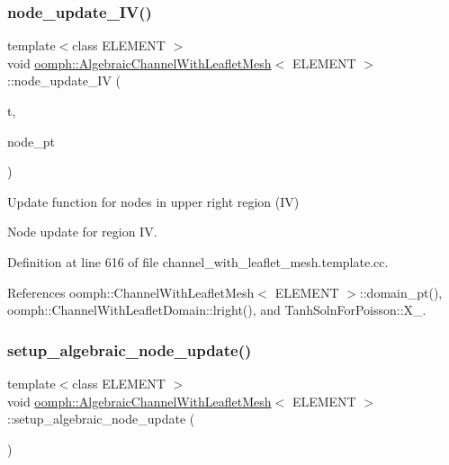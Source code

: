 \subsubsection{\texorpdfstring{node\+\_\+update\+\_\+\+I\+V()}{node\_update\_IV()}}
{\footnotesize\ttfamily template$<$class E\+L\+E\+M\+E\+NT $>$ \\
void \hyperlink{classoomph_1_1AlgebraicChannelWithLeafletMesh}{oomph\+::\+Algebraic\+Channel\+With\+Leaflet\+Mesh}$<$ E\+L\+E\+M\+E\+NT $>$\+::node\+\_\+update\+\_\+\+IV (\begin{DoxyParamCaption}\item[{const unsigned \&}]{t,  }\item[{Algebraic\+Node $\ast$\&}]{node\+\_\+pt }\end{DoxyParamCaption})\hspace{0.3cm}{\ttfamily [protected]}}



Update function for nodes in upper right region (IV) 

Node update for region IV. 

Definition at line 616 of file channel\+\_\+with\+\_\+leaflet\+\_\+mesh.\+template.\+cc.



References oomph\+::\+Channel\+With\+Leaflet\+Mesh$<$ E\+L\+E\+M\+E\+N\+T $>$\+::domain\+\_\+pt(), oomph\+::\+Channel\+With\+Leaflet\+Domain\+::lright(), and Tanh\+Soln\+For\+Poisson\+::\+X\+\_.

\mbox{\label{classoomph_1_1AlgebraicChannelWithLeafletMesh_a0d6cb8a8ffa830cdd73aa0f6686f150f}} 
\subsubsection{\texorpdfstring{setup\+\_\+algebraic\+\_\+node\+\_\+update()}{setup\_algebraic\_node\_update()}}
{\footnotesize\ttfamily template$<$class E\+L\+E\+M\+E\+NT $>$ \\
void \hyperlink{classoomph_1_1AlgebraicChannelWithLeafletMesh}{oomph\+::\+Algebraic\+Channel\+With\+Leaflet\+Mesh}$<$ E\+L\+E\+M\+E\+NT $>$\+::setup\+\_\+algebraic\+\_\+node\+\_\+update (\begin{DoxyParamCaption}{ }\end{DoxyParamCaption})\hspace{0.3cm}{\ttfamily [protected]}}



